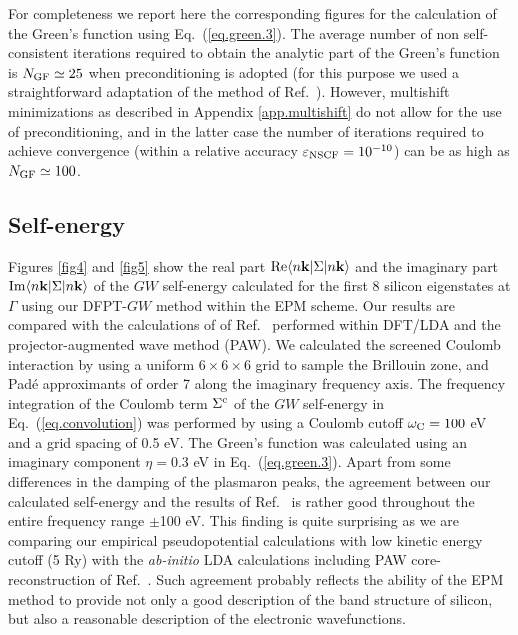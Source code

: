 \documentclass[twocolumn,prb,showpacs,superscriptaddress]{revtex4}
\def\wc{{\omega_{\rm C}}}
\def\k{{\bf k}}
\begin{document}
For completeness we report here the corresponding figures for
the calculation of the Green's function using Eq.~(\ref{eq.green.3}). The average number
of non self-consistent iterations required to obtain the analytic part of the Green's
function is $N_{\rm GF}\simeq 25$ when preconditioning is adopted (for this purpose 
we used a straightforward adaptation 
of the method of Ref.\ ). However, multishift minimizations as
described in Appendix \ref{app.multishift} do not allow for the use of preconditioning, and in the
latter case the number of iterations required to achieve convergence (within a relative
accuracy $\varepsilon_{\rm NSCF}=10^{-10}$) can be as high as $N_{\rm GF}\simeq 100$. 

\subsection{Self-energy}\label{sec.5c}

Figures \ref{fig4} and \ref{fig5} show the real part ${\rm Re} \langle n\k| \Sigma|n\k\rangle$ 
and the imaginary part ${\rm Im} \langle n\k| \Sigma|n\k\rangle$ of the
$GW$ self-energy calculated for the first 8 silicon eigenstates at $\Gamma$
using our DFPT-$GW$ method within the EPM scheme. Our results are compared
with the calculations of of Ref.\  performed within DFT/LDA 
and the projector-augmented wave method (PAW).
We calculated the screened Coulomb interaction by using a uniform $6\times 6 \times 6$ grid 
to sample the Brillouin zone, and Pad\'e approximants of order 7 along the imaginary
frequency axis. The frequency integration of the Coulomb term $\Sigma^{\rm c}$ of the $GW$ 
self-energy in Eq.~(\ref{eq.convolution}) was performed by using a Coulomb cutoff 
$\wc = 100$ eV and a grid spacing of 0.5 eV. The Green's function was calculated
using an imaginary component $\eta = 0.3$ eV in Eq.\ (\ref{eq.green.3}).
Apart from some differences in the damping of the plasmaron peaks,
the agreement between our calculated self-energy and the results of Ref.~
is rather good throughout the entire frequency range $\pm$100 eV.
This finding is quite surprising as we are comparing our empirical pseudopotential
calculations with low kinetic energy cutoff (5 Ry) with the {\it ab-initio} LDA
calculations including PAW core-reconstruction of Ref.\ .
Such agreement probably reflects the ability of the EPM method to provide not only
a good description of the band structure of silicon, but also a reasonable
description of the electronic wavefunctions.
\end{document}

